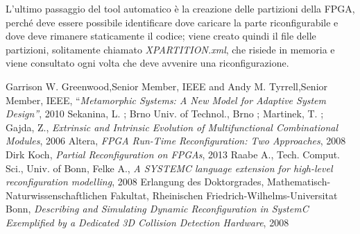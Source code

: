 \documentclass[11pt]{article} %
\begin{document}
L'ultimo passaggio del tool automatico è la creazione delle partizioni della FPGA, perché deve essere possibile identificare dove caricare la parte riconfigurabile e dove deve rimanere staticamente il codice; viene creato quindi il file delle partizioni, solitamente chiamato \textit{XPARTITION.xml}, che risiede in memoria e viene consultato ogni volta che deve avvenire una riconfigurazione.


\begin{thebibliography}{1}
 Garrison W. Greenwood,Senior Member, IEEE and Andy M. Tyrrell,Senior Member, IEEE, ``\textit{Metamorphic Systems: A New Model for Adaptive System Design''}, 2010
 Sekanina, L. ; Brno Univ. of Technol., Brno ; Martinek, T. ; Gajda, Z., \textit{Extrinsic and Intrinsic Evolution of Multifunctional Combinational Modules}, 2006
 Altera, \textit{FPGA Run-Time Reconfiguration: Two Approaches}, 2008
 Dirk Koch, \textit{Partial Reconfiguration on FPGAs}, 2013
 Raabe A., Tech. Comput. Sci., Univ. of Bonn, Felke A., \textit{A SYSTEMC language extension for high-level reconfiguration modelling}, 2008
 Erlangung des Doktorgrades, Mathematisch-Naturwissenschaftlichen Fakultat, Rheinischen Friedrich-Wilhelms-Universitat Bonn, \textit{Describing and Simulating Dynamic Reconfiguration in SystemC Exemplified by a Dedicated 3D Collision Detection Hardware}, 2008
\end{thebibliography}
\end{document}
